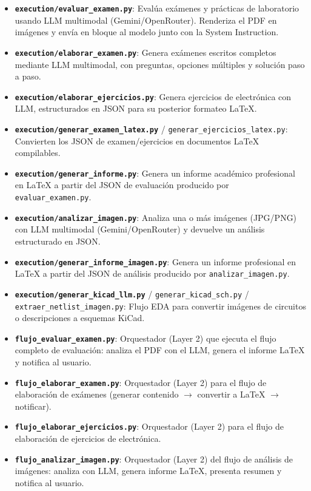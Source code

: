 \documentclass[12pt,a4paper]{article}
\begin{document}
\begin{itemize}
    \item \textbf{\texttt{execution/evaluar\_examen.py}}: Evalúa exámenes y prácticas de laboratorio usando LLM multimodal (Gemini/OpenRouter). Renderiza el PDF en imágenes y envía en bloque al modelo junto con la System Instruction.
    \item \textbf{\texttt{execution/elaborar\_examen.py}}: Genera exámenes escritos completos mediante LLM multimodal, con preguntas, opciones múltiples y solución paso a paso.
    \item \textbf{\texttt{execution/elaborar\_ejercicios.py}}: Genera ejercicios de electrónica con LLM, estructurados en JSON para su posterior formateo LaTeX.
    \item \textbf{\texttt{execution/generar\_examen\_latex.py}} / \texttt{generar\_ejercicios\_latex.py}: Convierten los JSON de examen/ejercicios en documentos LaTeX compilables.
    \item \textbf{\texttt{execution/generar\_informe.py}}: Genera un informe académico profesional en LaTeX a partir del JSON de evaluación producido por \texttt{evaluar\_examen.py}.
    \item \textbf{\texttt{execution/analizar\_imagen.py}}: Analiza una o más imágenes (JPG/PNG) con LLM multimodal (Gemini/OpenRouter) y devuelve un análisis estructurado en JSON.
    \item \textbf{\texttt{execution/generar\_informe\_imagen.py}}: Genera un informe profesional en LaTeX a partir del JSON de análisis producido por \texttt{analizar\_imagen.py}.
    \item \textbf{\texttt{execution/generar\_kicad\_llm.py}} / \texttt{generar\_kicad\_sch.py} / \texttt{extraer\_netlist\_imagen.py}: Flujo EDA para convertir imágenes de circuitos o descripciones a esquemas KiCad.
    \item \textbf{\texttt{flujo\_evaluar\_examen.py}}: Orquestador (Layer 2) que ejecuta el flujo completo de evaluación: analiza el PDF con el LLM, genera el informe LaTeX y notifica al usuario.
    \item \textbf{\texttt{flujo\_elaborar\_examen.py}}: Orquestador (Layer 2) para el flujo de elaboración de exámenes (generar contenido $\to$ convertir a LaTeX $\to$ notificar).
    \item \textbf{\texttt{flujo\_elaborar\_ejercicios.py}}: Orquestador (Layer 2) para el flujo de elaboración de ejercicios de electrónica.
    \item \textbf{\texttt{flujo\_analizar\_imagen.py}}: Orquestador (Layer 2) del flujo de análisis de imágenes: analiza con LLM, genera informe LaTeX, presenta resumen y notifica al usuario.

\end{itemize}
\end{document}
